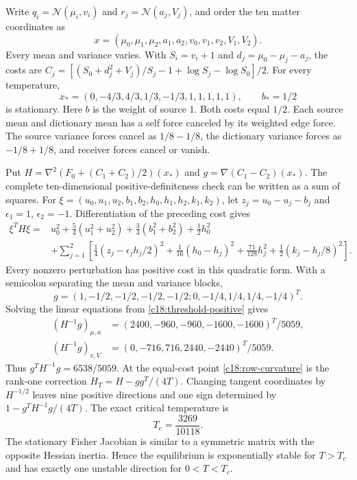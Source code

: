 Write $q_i=\mathcal N(\mu_i,v_i)$ and $r_j=\mathcal N(a_j,V_j)$, and order the ten matter coordinates as
\begin{equation}
 x=(\mu_0,\mu_1,\mu_2,a_1,a_2,v_0,v_1,v_2,V_1,V_2).
 \label{c18:threshold-order}
\end{equation}
Every mean and variance varies. With $S_i=v_i+1$ and $d_j=\mu_0-\mu_j-a_j$, the costs are $C_j=[(S_0+d_j^2+V_j)/S_j-1+\log S_j-\log S_0]/2$. For every temperature,
\begin{equation}
 x_*=(0,-4/3,4/3,1/3,-1/3,1,1,1,1,1),\qquad b_*=1/2
 \label{c18:threshold-point}
\end{equation}
is stationary. Here $b$ is the weight of source $1$. Both costs equal $1/2$. Each source mean and dictionary mean has a self force canceled by its weighted edge force. The source variance forces cancel as $1/8-1/8$, the dictionary variance forces as $-1/8+1/8$, and receiver forces cancel or vanish.

Put $H=\nabla^2(F_0+(C_1+C_2)/2)(x_*)$ and $g=\nabla(C_1-C_2)(x_*)$. The complete ten-dimensional positive-definiteness check can be written as a sum of squares. For $\xi=(u_0,u_1,u_2,b_1,b_2,h_0,h_1,h_2,k_1,k_2)$, let $z_j=u_0-u_j-b_j$ and $\epsilon_1=1$, $\epsilon_2=-1$. Differentiation of the preceding cost gives
\begin{equation}
 \begin{aligned}
 \xi^TH\xi={}&u_0^2+\tfrac54(u_1^2+u_2^2)
       +\tfrac34(b_1^2+b_2^2)+\tfrac12h_0^2\\
 &+\sum_{j=1}^2\left[
       \tfrac14(z_j-\epsilon_jh_j/2)^2+\tfrac1{16}(h_0-h_j)^2
       +\tfrac{71}{128}h_j^2+\tfrac12(k_j-h_j/8)^2\right].
 \end{aligned}
 \label{c18:threshold-positive}
\end{equation}
Every nonzero perturbation has positive cost in this quadratic form. With a semicolon separating the mean and variance blocks,
\begin{equation}
 g=(1,-1/2,-1/2,-1/2,-1/2;0,-1/4,1/4,1/4,-1/4)^T.
 \label{c18:threshold-gradient}
\end{equation}
Solving the linear equations from \cref{c18:threshold-positive} gives
\begin{equation}
 \begin{aligned}
 (H^{-1}g)_{\mu,a}&=(2400,-960,-960,-1600,-1600)^T/5059,\\
 (H^{-1}g)_{v,V}&=(0,-716,716,2440,-2440)^T/5059.
 \end{aligned}
 \label{c18:threshold-direction}
\end{equation}
Thus $g^TH^{-1}g=6538/5059$. At the equal-cost point \cref{c18:row-curvature} is the rank-one correction $H_T=H-gg^T/(4T)$. Changing tangent coordinates by $H^{-1/2}$ leaves nine positive directions and one sign determined by $1-g^TH^{-1}g/(4T)$. The exact critical temperature is
\begin{equation}
 T_c=\frac{3269}{10118}.
 \label{c18:critical-temperature}
\end{equation}
The stationary Fisher Jacobian is similar to a symmetric matrix with the opposite Hessian inertia. Hence the equilibrium is exponentially stable for $T>T_c$ and has exactly one unstable direction for $0<T<T_c$.

